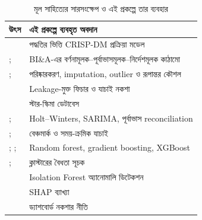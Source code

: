 \begin{table}[htbp]\centering\small
\caption{মূল সাহিত্যের সারসংক্ষেপ ও এই প্রকল্পে তার ব্যবহার}\label{tab:litsummary}
\begin{tabularx}{\linewidth}{@{}p{4.2cm}X@{}}
\toprule
\textbf{উৎস} & \textbf{এই প্রকল্পে ব্যবহৃত অবদান} \\ \midrule
\citet{shearer2000} & পদ্ধতির ভিত্তি CRISP-DM প্রক্রিয়া মডেল \\
\citet{chen2012}; \citet{sharda2018} & BI\&A-এর বর্ণনামূলক--পূর্বাভাসমূলক--নির্দেশমূলক কাঠামো \\
\citet{garcia2015}; \citet{han2012} & পরিষ্কারকরণ, imputation, outlier ও রূপান্তর কৌশল \\
\citet{kaufman2012} & Leakage-মুক্ত ফিচার ও যাচাই নকশা \\
\citet{kimball2013} & স্টার-স্কিমা ডেটাবেস \\
\citet{hyndman2021}; \citet{winters1960} & Holt--Winters, SARIMA, পূর্বাভাস reconciliation \\
\citet{makridakis2018}; \citet{bergmeir2012} & বেঞ্চমার্ক ও সময়-ক্রমিক যাচাই \\
\citet{breiman2001}; \citet{friedman2001}; \citet{chen2016} & Random forest, gradient boosting, XGBoost \\
\citet{rousseeuw1987}; \citet{davies1979} & ক্লাস্টারের বৈধতা সূচক \\
\citet{liu2008} & Isolation Forest অ্যানোমালি ডিটেকশন \\
\citet{lundberg2017} & SHAP ব্যাখ্যা \\
\citet{few2013} & ড্যাশবোর্ড নকশার নীতি \\ \bottomrule
\end{tabularx}
\end{table}

